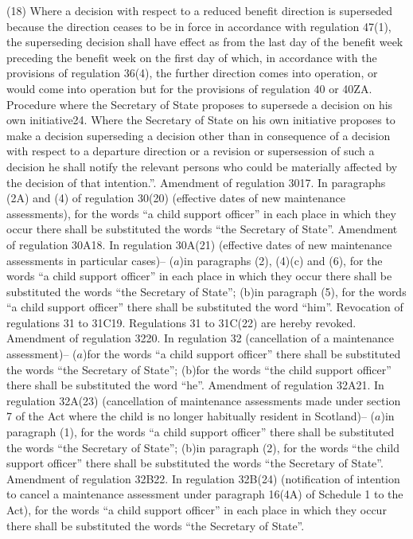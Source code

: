 \documentclass[12pt,a4paper]{article}
\begin{document}
(18) Where a decision with respect to a reduced benefit direction is superseded because the direction ceases to be in force in accordance with regulation 47(1), the superseding decision shall have effect as from the last day of the benefit week preceding the benefit week on the first day of which, in accordance with the provisions of regulation 36(4), the further direction comes into operation, or would come into operation but for the provisions of regulation 40 or 40ZA.
Procedure where the Secretary of State proposes to supersede a decision on his own initiative24.  Where the Secretary of State on his own initiative proposes to make a decision superseding a decision other than in consequence of a decision with respect to a departure direction or a revision or supersession of such a decision he shall notify the relevant persons who could be materially affected by the decision of that intention.”.
Amendment of regulation 3017.  In paragraphs (2A) and (4) of regulation 30(20) (effective dates of new maintenance assessments), for the words “a child support officer” in each place in which they occur there shall be substituted the words “the Secretary of State”.
Amendment of regulation 30A18.  In regulation 30A(21) (effective dates of new maintenance assessments in particular cases)–
($a$)in paragraphs (2), (4)(c) and (6), for the words “a child support officer” in each place in which they occur there shall be substituted the words “the Secretary of State”;
(b)in paragraph (5), for the words “a child support officer” there shall be substituted the word “him”.
Revocation of regulations 31 to 31C19.  Regulations 31 to 31C(22) are hereby revoked.
Amendment of regulation 3220.  In regulation 32 (cancellation of a maintenance assessment)–
($a$)for the words “a child support officer” there shall be substituted the words “the Secretary of State”;
(b)for the words “the child support officer” there shall be substituted the word “he”.
Amendment of regulation 32A21.  In regulation 32A(23) (cancellation of maintenance assessments made under section 7 of the Act where the child is no longer habitually resident in Scotland)–
($a$)in paragraph (1), for the words “a child support officer” there shall be substituted the words “the Secretary of State”;
(b)in paragraph (2), for the words “the child support officer” there shall be substituted the words “the Secretary of State”.
Amendment of regulation 32B22.  In regulation 32B(24) (notification of intention to cancel a maintenance assessment under paragraph 16(4A) of Schedule 1 to the Act), for the words “a child support officer” in each place in which they occur there shall be substituted the words “the Secretary of State”.
\end{document}
